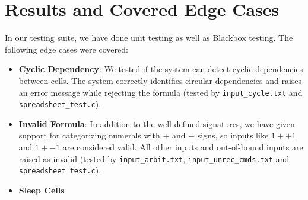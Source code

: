 \documentclass[10pt,a4paper]{article}  %
\begin{document}
\section{Results and Covered Edge Cases}

In our testing suite, we have done unit testing as well as Blackbox testing.
The following edge cases were covered:

\begin{itemize}
    \item \textbf{Cyclic Dependency}: We tested if the system can detect cyclic dependencies between cells. The system correctly identifies circular dependencies and raises an error message while rejecting the formula (tested by \texttt{input\_cycle.txt} and \texttt{spreadsheet\_test.c}).
    \item \textbf{Invalid Formula}: In addition to the well-defined signatures, we have given support for categorizing numerals with \(+\) and \(-\) signs, so inputs like \(1++1\) and \(1+-1\) are considered valid. All other inputs and out-of-bound inputs are raised as invalid (tested by \texttt{input\_arbit.txt}, \texttt{input\_unrec\_cmds.txt} and \texttt{spreadsheet\_test.c}).
    \item \textbf{Sleep Cells}
\end{itemize}




\end{document}
